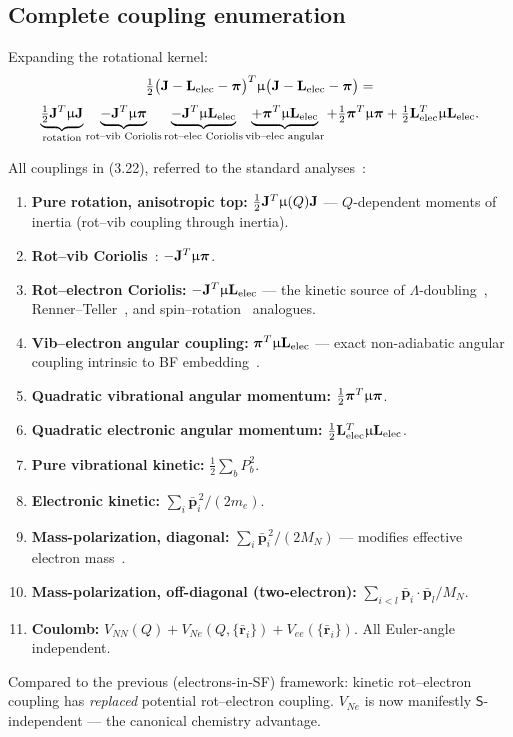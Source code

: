 \subsection{Complete coupling enumeration}

Expanding the rotational kernel:
$$
\tfrac12\bigl(\mathbf{J}-\mathbf{L}_{\mathrm{elec}}-\boldsymbol{\pi}\bigr)^T\upmu\bigl(\mathbf{J}-\mathbf{L}_{\mathrm{elec}}-\boldsymbol{\pi}\bigr)=
$$
$$
\underbrace{\tfrac12\mathbf{J}^T\upmu\mathbf{J}}_{\text{rotation}}
\underbrace{-\mathbf{J}^T\upmu\boldsymbol{\pi}}_{\text{rot–vib Coriolis}}
\underbrace{-\mathbf{J}^T\upmu\mathbf{L}_{\mathrm{elec}}}_{\text{rot–elec Coriolis}}
\underbrace{+\boldsymbol{\pi}^{T}\upmu\mathbf{L}_{\mathrm{elec}}}_{\text{vib–elec angular}}
+\tfrac12\boldsymbol{\pi}^{T}\upmu\boldsymbol{\pi}+\tfrac12\mathbf{L}_{\mathrm{elec}}^{T}\upmu\mathbf{L}_{\mathrm{elec}}.
$$

All couplings in (3.22), referred to the standard analyses~\cite{watson1968,bunkerjensen}:
\begin{enumerate}
    \item \textbf{Pure rotation, anisotropic top:} $\tfrac12\mathbf{J}^T\upmu(Q)\mathbf{J}$ --- $Q$-dependent moments of inertia (rot–vib coupling through inertia).
    \item \textbf{Rot–vib Coriolis}~\cite{wilson1955}: $-\mathbf{J}^T\upmu\boldsymbol{\pi}$.
    \item \textbf{Rot–electron Coriolis:} $-\mathbf{J}^T\upmu\mathbf{L}_{\mathrm{elec}}$ --- the kinetic source of $\Lambda$-doubling~\cite{mullikenchristy1931,vanvleck1951}, Renner–Teller~\cite{renner1934}, and spin–rotation~\cite{curl1965} analogues.
    \item \textbf{Vib–electron angular coupling:} $\boldsymbol{\pi}^{T}\upmu\mathbf{L}_{\mathrm{elec}}$ --- exact non-adiabatic angular coupling intrinsic to BF embedding~\cite{bornoppenheimer1927,bornhuang1954,littlejohn1997}.
    \item \textbf{Quadratic vibrational angular momentum:} $\tfrac12\boldsymbol{\pi}^{T}\upmu\boldsymbol{\pi}$.
    \item \textbf{Quadratic electronic angular momentum:} $\tfrac12\mathbf{L}_{\mathrm{elec}}^{T}\upmu\mathbf{L}_{\mathrm{elec}}$.
    \item \textbf{Pure vibrational kinetic:} $\tfrac12\sum_{b}P_b^2$.
    \item \textbf{Electronic kinetic:} $\sum_i\bar{\mathbf{p}}_i^{\,2}/(2m_e)$.
    \item \textbf{Mass-polarization, diagonal:} $\sum_i\bar{\mathbf{p}}_i^{\,2}/(2M_N)$ --- modifies effective electron mass~\cite{bornoppenheimer1927,bunkerjensen}.
    \item \textbf{Mass-polarization, off-diagonal (two-electron):} $\sum_{i<l}\bar{\mathbf{p}}_i\!\cdot\!\bar{\mathbf{p}}_l/M_N$.
    \item \textbf{Coulomb:} $V_{NN}(Q)+V_{Ne}(Q,\{\bar{\mathbf{r}}_i\})+V_{ee}(\{\bar{\mathbf{r}}_i\})$. All Euler-angle independent.
\end{enumerate}

Compared to the previous (electrons-in-SF) framework: kinetic rot–electron coupling has \emph{replaced} potential rot–electron coupling. $V_{Ne}$ is now manifestly $\mathsf{S}$-independent --- the canonical chemistry advantage.\newpage
